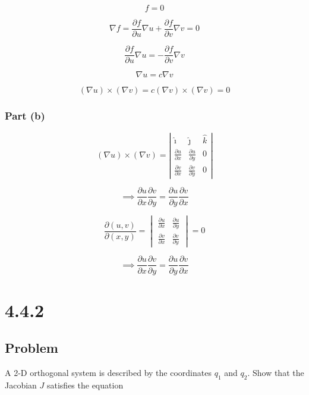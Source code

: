 \documentclass[12pt]{article}
\begin{document}
\[
    f = 0
\]

\[
    \nabla f = \frac{\partial f}{\partial u} \nabla u + \frac{\partial f}{\partial v} \nabla v = 0
\]

\[
    \frac{\partial f}{\partial u} \nabla u = -\frac{\partial f}{\partial v} \nabla v
\]

\[
    \nabla u = c \nabla v
\]

\[
    (\nabla u) \times (\nabla v) = c (\nabla v) \times (\nabla v) = 0
\]

\subsubsection{Part (b)}

\[
    (\nabla u) \times (\nabla v) = \left|\begin{array}{ccc}
        \hat{\imath}                  & \hat{\jmath}                  & \hat{k} \\
        \frac{\partial u}{\partial x} & \frac{\partial u}{\partial y} & 0       \\
        \frac{\partial v}{\partial x} & \frac{\partial v}{\partial y} & 0
    \end{array}\right|
\]

\[
    \implies \frac{\partial u}{\partial x} \frac{\partial v}{\partial y} = \frac{\partial u}{\partial y} \frac{\partial v}{\partial x}
\]

\[
    \frac{\partial (u,v)}{\partial (x,y)} = \begin{vmatrix}
        \frac{\partial u}{\partial x} & \frac{\partial u}{\partial y} \\
        \frac{\partial v}{\partial x} & \frac{\partial v}{\partial y}
    \end{vmatrix} = 0
\]

\[
    \implies \frac{\partial u}{\partial x} \frac{\partial v}{\partial y} = \frac{\partial u}{\partial y} \frac{\partial v}{\partial x}
\]

\newpage
\section{4.4.2}

\subsection{Problem}

A 2-D orthogonal system is described by the coordinates \(q_{1}\) and \(q_{2}\). Show that the Jacobian \(J\) satisfies the equation
\end{document}
